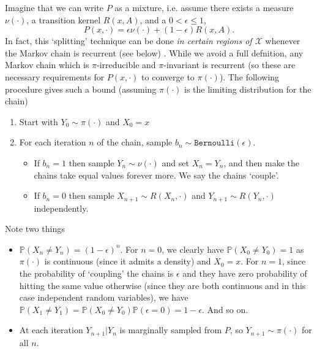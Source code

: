 \documentclass{article}
\newcommand{\X}{\mathcal{X}}
\begin{document}
Imagine that we can write $P$ as a mixture, i.e. assume there exists a measure $\nu(\cdot)$, a transition kernel $R(x,A)$, and a $0<\epsilon\leq1$, 
\begin{equation} \label{eqn:doeblin}
P(x,\cdot) = \epsilon \nu(\cdot) + (1 - \epsilon)R(x,A).
\end{equation}
In fact, this `splitting' technique can be done \emph{in certain regions of $\X$} whenever the Markov chain is recurrent (see below) \cite{}.  While we avoid a full defnition, any Markov chain which is $\pi$-irreducible and $\pi$-invariant is recurrent (so these are necessary requirements for $P(x,\cdot)$ to converge to $\pi(\cdot)$).  The following procedure gives such a bound (assuming $\pi(\cdot)$ is the limiting distribution for the chain)
\begin{enumerate}
\item Start with $Y_0 \sim \pi(\cdot)$ and $X_0 = x$
\item For each iteration $n$ of the chain, sample $b_n \sim \texttt{Bernoulli}(\epsilon)$. 
\begin{itemize}
\item If $b_n = 1$ then sample $Y_n \sim \nu(\cdot)$ and set $X_n = Y_n$, and then make the chains take equal values forever more. We say the chains  `couple'.
\item If $b_n = 0$ then sample $X_{n+1} \sim R(X_n,\cdot)$ and $Y_{n+1} \sim R(Y_{n},\cdot)$ independently.
\end{itemize}
\end{enumerate}
Note two things
\begin{itemize}
\item $\mathbb{P}(X_n \neq Y_n) = (1-\epsilon)^n$.  For $n=0$, we clearly have $\mathbb{P}(X_0 \neq Y_0)=1$ as $\pi(\cdot)$ is continuous (since it admits a density) and $X_0 = x$. For $n=1$, since the probability of `coupling' the chains is $\epsilon$ and they have zero probability of hitting the same value otherwise (since they are both continuous and in this case independent random variables), we have $\mathbb{P}(X_1 \neq Y_1)=\mathbb{P}(X_0 \neq Y_0)\mathbb{P}(\epsilon=0)=1-\epsilon$. And so on.
\item At each iteration $Y_{n+1}|Y_n$ is marginally  sampled from $P$, so $Y_{n+1} \sim \pi(\cdot)$ for all $n$.
\end{itemize}
\end{document}
